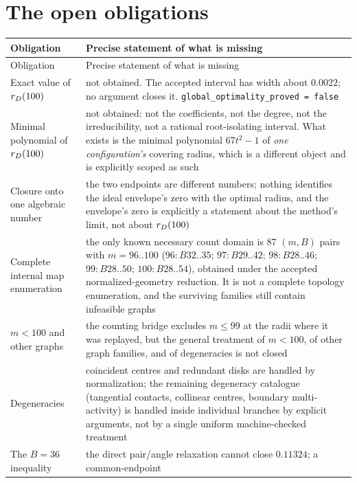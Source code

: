 \section{The open obligations}

{\footnotesize
\begin{longtable}{@{}>{\raggedright\arraybackslash}p{}>{\raggedright\arraybackslash}p{}@{}}
\toprule
Obligation & Precise statement of what is missing \\
\midrule
\endfirsthead
\toprule
Obligation & Precise statement of what is missing \\
\midrule
\endhead
\bottomrule
\endlastfoot
Exact value of $r_{D}(100)$ & not obtained. The accepted interval has width about $0.0022$; no
argument closes it. \texttt{global\_\allowbreak{}optimality\_\allowbreak{}proved = false} \\
Minimal polynomial of $r_{D}(100)$ & not obtained: not the coefficients, not the degree, not the
irreducibility, not a rational root-isolating interval. What exists is the minimal polynomial
$67t^2-1$ of \emph{one configuration's} covering radius, which is a different object and is
explicitly scoped as such \\
Closure onto one algebraic number & the two endpoints are different numbers; nothing identifies the
ideal envelope's zero with the optimal radius, and the envelope's zero is explicitly a statement
about the method's limit, not about $r_{D}(100)$ \\
Complete internal map enumeration & the only known necessary count domain is $87$ $(m,B)$ pairs with
$m=96..100$ ($96:B32..35$; $97:B29..42$; $98:B28..46$; $99:B28..50$; $100:B28..54$), obtained under
the accepted normalized-geometry reduction. It is not a complete topology enumeration, and the
surviving families still contain infeasible graphs \\
$m<100$ and other graphs & the counting bridge excludes $m\le99$ at the radii where it was replayed,
but the general treatment of $m<100$, of other graph families, and of degeneracies is not closed \\
Degeneracies & coincident centres and redundant disks are handled by normalization; the remaining
degeneracy catalogue (tangential contacts, collinear centres, boundary multi-activity) is handled
inside individual branches by explicit arguments, not by a single uniform machine-checked treatment \\
The $B=36$ inequality & the direct pair/angle relaxation cannot close $0.11324$; a common-endpoint

\end{longtable}}
